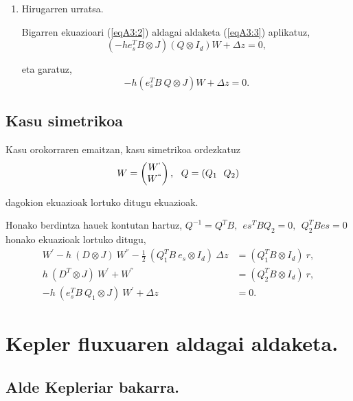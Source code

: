 \begin{enumerate}
\item Hirugarren urratsa.

Bigarren ekuazioari (\ref{eqA3:2}) aldagai aldaketa (\ref{eqA3:3}) aplikatuz,
\begin{equation*}
(- h e_s^T B \otimes J) (Q \otimes I_d) W + \Delta z =0, 
\end{equation*}

eta garatuz,
\begin{equation*}
- h (e_s^T 
B \ Q \otimes J) W +\Delta z =0.
\end{equation*}

\end{enumerate}

\subsection*{Kasu simetrikoa}
\label{serans:A32}

Kasu orokorraren emaitzan, kasu simetrikoa ordezkatuz 
\begin{align*}
W=\left(
\begin{matrix}
W^{`} \\
W^{``} 
\end{matrix}
\right), \ \ Q=(Q_1 \ \ Q_2)
\end{align*}

dagokion ekuazioak lortuko ditugu ekuazioak.

Honako berdintza hauek kontutan hartuz, $Q^{-1}=Q^TB, \ \ es^TBQ_2=0, \ \ Q_2^TBes=0$ honako ekuazioak lortuko ditugu,
\begin{align*}
 W^{'}-h \ (D \otimes J) \ W^{''} -\frac{1}{2}\ (Q_1^T B \ e_s \otimes I_d) \ \Delta z &= (Q_1^T B \otimes I_d) \ r,\\
 h \ (D^T \otimes J) \ W^{'}+W^{''} &= (Q_2^T B \otimes I_d) \ r, \\
  - h \ (e_s^T B \ Q_1 \otimes J) \ W^{'} + \Delta z &=0. 
\end{align*}

\section{Kepler fluxuaren aldagai aldaketa.}
\label{erans:A4}


\subsection*{Alde Kepleriar bakarra.}


